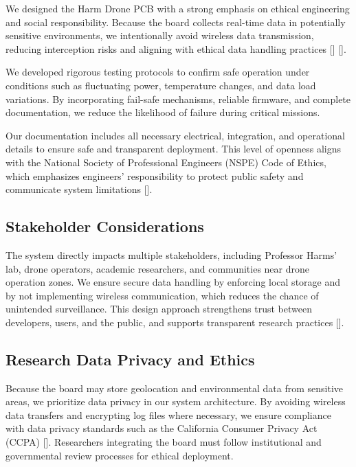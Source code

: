 \documentclass[12pt]{article}
\begin{document}
\par We designed the Harm Drone PCB with a strong emphasis on ethical engineering and social responsibility. Because the board collects real-time data in potentially sensitive environments, we intentionally avoid wireless data transmission, reducing interception risks and aligning with ethical data handling practices [] [].

\par We developed rigorous testing protocols to confirm safe operation under conditions such as fluctuating power, temperature changes, and data load variations. By incorporating fail-safe mechanisms, reliable firmware, and complete documentation, we reduce the likelihood of failure during critical missions.

\par Our documentation includes all necessary electrical, integration, and operational details to ensure safe and transparent deployment. This level of openness aligns with the National Society of Professional Engineers (NSPE) Code of Ethics, which emphasizes engineers' responsibility to protect public safety and communicate system limitations [].

\subsection{Stakeholder Considerations}

\par The system directly impacts multiple stakeholders, including Professor Harms' lab, drone operators, academic researchers, and communities near drone operation zones. We ensure secure data handling by enforcing local storage and by not implementing wireless communication, which reduces the chance of unintended surveillance. This design approach strengthens trust between developers, users, and the public, and supports transparent research practices [].

\subsection{Research Data Privacy and Ethics}

\par Because the board may store geolocation and environmental data from sensitive areas, we prioritize data privacy in our system architecture. By avoiding wireless data transfers and encrypting log files where necessary, we ensure compliance with data privacy standards such as the California Consumer Privacy Act (CCPA) []. Researchers integrating the board must follow institutional and governmental review processes for ethical deployment.
\end{document}
